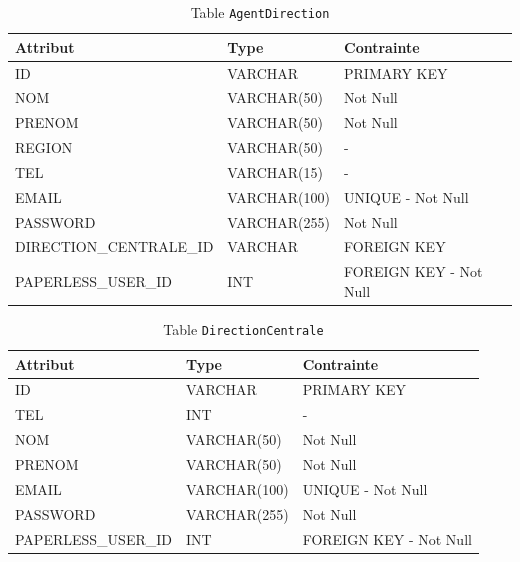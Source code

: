 \begin{table}[h!]
\centering
\begin{tabular}{|l|l|l|}
\hline
\textbf{Attribut} & \textbf{Type} & \textbf{Contrainte} \\
\hline
ID & VARCHAR & PRIMARY KEY \\
NOM & VARCHAR(50) & Not Null \\
PRENOM & VARCHAR(50) & Not Null \\
REGION & VARCHAR(50) & - \\
TEL & VARCHAR(15) & - \\
EMAIL & VARCHAR(100) & UNIQUE - Not Null \\
PASSWORD & VARCHAR(255) & Not Null \\
DIRECTION\_CENTRALE\_ID & VARCHAR & FOREIGN KEY \\
PAPERLESS\_USER\_ID & INT & FOREIGN KEY - Not Null \\
\hline
\end{tabular}
\caption{Table \texttt{AgentDirection}}
\end{table}
\begin{table}[h!]
\centering
\begin{tabular}{|l|l|l|}
\hline
\textbf{Attribut} & \textbf{Type} & \textbf{Contrainte} \\
\hline
ID & VARCHAR & PRIMARY KEY \\
TEL & INT & - \\
NOM & VARCHAR(50) & Not Null \\
PRENOM & VARCHAR(50) & Not Null \\
EMAIL & VARCHAR(100) & UNIQUE - Not Null \\
PASSWORD & VARCHAR(255) & Not Null \\
PAPERLESS\_USER\_ID & INT & FOREIGN KEY - Not Null \\
\hline
\end{tabular}
\caption{Table \texttt{DirectionCentrale}}
\end{table}
